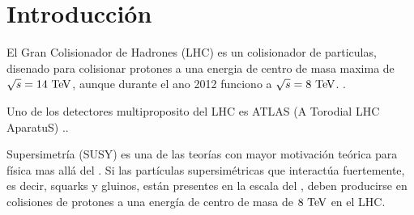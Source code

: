 \chapter*{Introducción}

El Gran Colisionador de Hadrones (LHC) \cite{Evans:1129806} es un colisionador
de particulas, disenado para colisionar protones a una energia de centro de masa
maxima de $\sqrt{s} = 14 \tev$, aunque durante el ano 2012 funciono a $\sqrt{s}=8\tev$.
.


Uno de los detectores multiproposito del LHC es ATLAS (A Torodial LHC AparatuS) \cite{atlas} ..




Supersimetría (SUSY) \cite{Miyazawa:1966,Ramond:1971gb,Golfand:1971iw,Neveu:1971rx,Neveu:1971iv,Gervais:1971ji,Volkov:1973ix,Wess:1973kz,Wess:1974tw}
es una de las teorías con mayor motivación teórica para
física mas allá del {\SM}. Si las partículas supersimétricas que interactúa
fuertemente, es decir, squarks y gluinos, están presentes en la escala del {\tev},
deben producirse en colisiones de protones a una energía de centro de masa de $8
\tev$ en el LHC.



